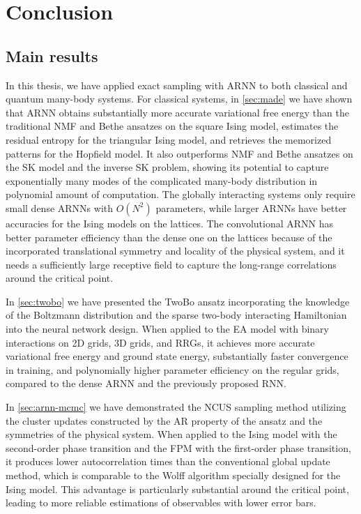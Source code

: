 \chapter{Conclusion}
\label{ch:conclusion}

\section{Main results}

In this thesis, we have applied exact sampling with ARNN to both classical and quantum many-body systems. For classical systems, in \cref{sec:made} we have shown that ARNN obtains substantially more accurate variational free energy than the traditional NMF and Bethe ansatzes on the square Ising model, estimates the residual entropy for the triangular Ising model, and retrieves the memorized patterns for the Hopfield model. It also outperforms NMF and Bethe ansatzes on the SK model and the inverse SK problem, showing its potential to capture exponentially many modes of the complicated many-body distribution in polynomial amount of computation. The globally interacting systems only require small dense ARNNs with $O(N^2)$ parameters, while larger ARNNs have better accuracies for the Ising models on the lattices. The convolutional ARNN has better parameter efficiency than the dense one on the lattices because of the incorporated translational symmetry and locality of the physical system, and it needs a sufficiently large receptive field to capture the long-range correlations around the critical point.

In \cref{sec:twobo} we have presented the TwoBo ansatz incorporating the knowledge of the Boltzmann distribution and the sparse two-body interacting Hamiltonian into the neural network design. When applied to the EA model with binary interactions on 2D grids, 3D grids, and RRGs, it achieves more accurate variational free energy and ground state energy, substantially faster convergence in training, and polynomially higher parameter efficiency on the regular grids, compared to the dense ARNN and the previously proposed RNN.

In \cref{sec:arnn-mcmc} we have demonstrated the NCUS sampling method utilizing the cluster updates constructed by the AR property of the ansatz and the symmetries of the physical system. When applied to the Ising model with the second-order phase transition and the FPM with the first-order phase transition, it produces lower autocorrelation times than the conventional global update method, which is comparable to the Wolff algorithm specially designed for the Ising model. This advantage is particularly substantial around the critical point, leading to more reliable estimations of observables with lower error bars.

